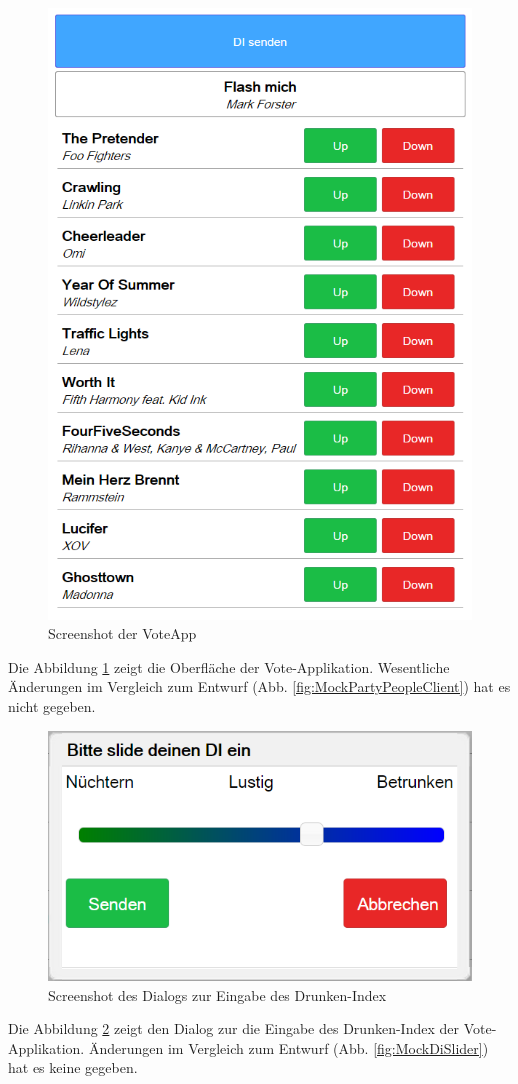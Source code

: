 \begin{figure}[H]
\centering
\includegraphics[width=0.6\linewidth]{Bilder/Screenshot-Vote-App}
\caption{Screenshot der VoteApp}
\label{fig:Screenshot-Vote-App}
\end{figure}

Die Abbildung \ref{fig:Screenshot-Vote-App} zeigt die Oberfläche der Vote-Applikation. Wesentliche Änderungen im Vergleich zum Entwurf (Abb. \ref{fig:MockPartyPeopleClient}) hat es nicht gegeben. 

\begin{figure}[H]
\centering
\includegraphics[width=0.5\linewidth]{Bilder/Screenshot-VoteApp-DI-Slider}
\caption{Screenshot des Dialogs zur Eingabe des Drunken-Index}
\label{fig:Screenshot-Vote-App_Slider}
\end{figure}

Die Abbildung \ref{fig:Screenshot-Vote-App_Slider} zeigt den Dialog zur die Eingabe des Drunken-Index der Vote-Applikation. Änderungen im Vergleich zum Entwurf (Abb. \ref{fig:MockDiSlider}) hat es keine gegeben.
